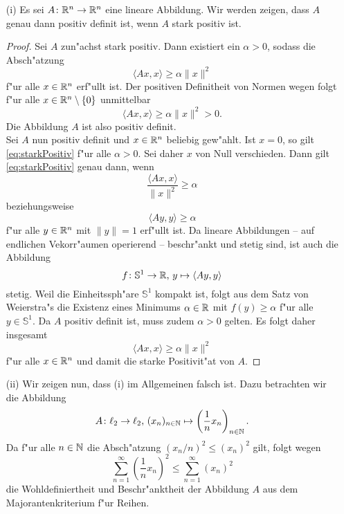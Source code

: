 
\begin{itemize}
\item[(i)]
Es sei $A\colon\mathbb{R}^n\to\mathbb{R}^n$ eine lineare Abbildung. Wir werden zeigen, dass
$A$ genau dann positiv definit ist, wenn $A$ stark positiv ist.

\begin{proof}
Sei $A$ zun"achst stark positiv. Dann existiert ein $\alpha>0$, sodass die
Absch"atzung
\begin{equation}\label{eq:starkPositiv}
\langle{Ax,x}\rangle \ge \alpha\lVert x\rVert^2
\end{equation}
f"ur alle $x\in\mathbb{R}^n$ erf"ullt ist. Der positiven Definitheit von Normen wegen
folgt f"ur alle $x\in\mathbb{R}^n \setminus\{0\}$ unmittelbar
\[
\langle{Ax,x}\rangle \ge \alpha\lVert x\rVert^2 > 0.
\]
Die Abbildung $A$ ist also positiv definit.\\

Sei $A$ nun positiv definit und $x\in\mathbb{R}^n$ beliebig gew"ahlt. Ist $x=0$,
so gilt \eqref{eq:starkPositiv}
f"ur alle $\alpha>0$. Sei daher $x$ von Null verschieden. Dann gilt
\eqref{eq:starkPositiv} genau dann, wenn
\[
\frac{\langle Ax,x \rangle}{\lVert x \rVert^2} \ge \alpha
\]
beziehungsweise
\[
\langle Ay,y \rangle \ge \alpha
\]
f"ur alle $y\in\mathbb{R}^n$ mit $\lVert y \rVert = 1$ erf"ullt ist. Da lineare
Abbildungen -- auf endlichen Vekorr"aumen operierend -- beschr"ankt und
stetig sind, ist auch die Abbildung
\[
f\colon\mathbb{S}^1\to\mathbb{R} \text{, } y\mapsto\langle Ay,y\rangle
\]
stetig. Weil die Einheitssph"are $\mathbb{S}^1$ kompakt ist, folgt aus dem
Satz von Weierstra"s die Existenz eines Minimums $\alpha\in\mathbb{R}$ mit
$f(y)\ge \alpha$ f"ur alle $y\in\mathbb{S}^1$. Da $A$ positiv definit ist,
muss zudem $\alpha>0$ gelten. Es folgt daher insgesamt
\[
\langle{Ax,x}\rangle \ge \alpha\lVert x\rVert^2
\]
f"ur alle $x\in\mathbb{R}^n$ und damit die starke Positivit"at von $A$.
\end{proof}

\item[(ii)]
Wir zeigen nun, dass (i) im Allgemeinen falsch ist. Dazu betrachten wir die
Abbildung
\[
A\colon \ell_2\to \ell_2 \text{, } (x_n)_{n\in\mathbb{N}} \mapsto
\left(\frac{1}{n}x_n\right)_{n\in\mathbb{N}}.
\]
Da f"ur alle $n\in\mathbb{N}$ die Absch"atzung $(x_n / n)^2 \le (x_n)^2$ gilt,
folgt wegen
\[
\sum_{n=1}^\infty \left(\frac{1}{n} x_n\right)^2 \le
\sum_{n=1}^\infty (x_n)^2
\]
die Wohldefiniertheit und Beschr"anktheit der Abbildung $A$ aus dem Majorantenkriterium f"ur Reihen.\\


\end{itemize}
